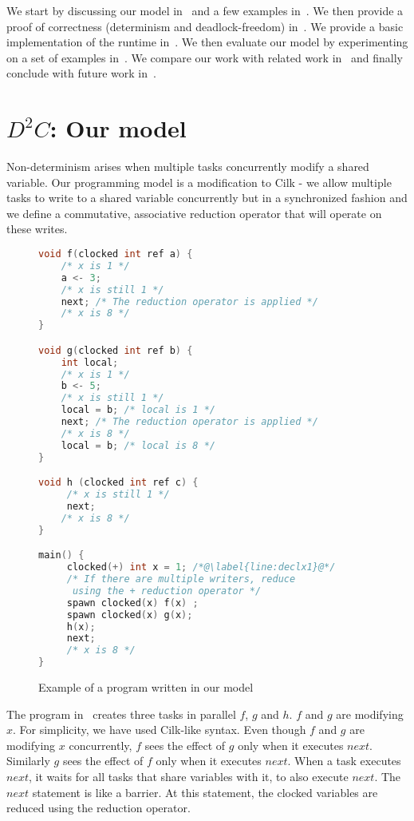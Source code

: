 \documentclass[10pt, conference, compsocconf]{IEEEtran}
\begin{document}
We start by discussing our model in~ and a few examples in~. 
We then provide a  proof of correctness (determinism and deadlock-freedom) in~. 
We provide a basic implementation of the runtime in~. 
We then evaluate our model by experimenting on a set of examples in~. 
We compare our work with related work in~ and finally conclude with future work in~.



\section{$D^2C$: Our model}
\label{sec:model}

Non-determinism arises when multiple tasks concurrently modify a shared variable.
Our programming model is a modification to Cilk - we allow multiple tasks to write to
a shared variable concurrently but in a synchronized fashion and we define a commutative, associative
reduction operator that will operate on these
writes.
\begin{figure}
\begin{lstlisting}[language=C]
void f(clocked int ref a) {
    /* x is 1 */
    a <- 3;
    /* x is still 1 */
    next; /* The reduction operator is applied */
    /* x is 8 */
}

void g(clocked int ref b) {
    int local;
    /* x is 1 */
    b <- 5;
    /* x is still 1 */
    local = b; /* local is 1 */
    next; /* The reduction operator is applied */
    /* x is 8 */
    local = b; /* local is 8 */
}

void h (clocked int ref c) {
     /* x is still 1 */
     next;
    /* x is 8 */
}

main() {
     clocked(+) int x = 1; /*@\label{line:declx1}@*/
     /* If there are multiple writers, reduce
      using the + reduction operator */
     spawn clocked(x) f(x) ;
     spawn clocked(x) g(x);
     h(x);
     next;
     /* x is 8 */
}
\end{lstlisting}
\caption{Example of a program written in our model}
\label{fig:ddc}
\end{figure}


The program in~ creates three tasks
in parallel $f$, $g$ and $h$. $f$ and $g$ are
modifying $x$.
For simplicity, we have used Cilk\cite{blumofe1995cilk}-like syntax.
Even though $f$ and $g$ are modifying
$x$ concurrently, $f$ sees the effect of $g$ only
when it executes $next$. Similarly $g$ sees the effect
of $f$ only when it executes $next$.
When a task executes $next$, it waits for all tasks that
share variables with it, to also execute $next$. The $next$
statement is like a barrier. At this statement, the clocked variables are reduced
using the reduction operator.
\end{document}
